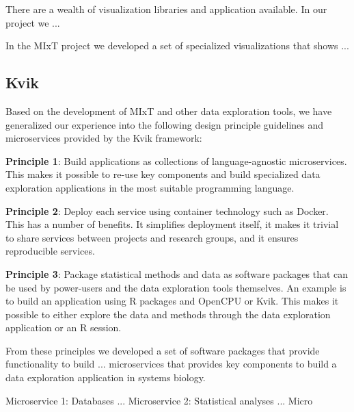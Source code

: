 There are a wealth of visualization libraries and application available. In our
project we ... 

In the MIxT project we developed a set of specialized visualizations that
shows ... 


\subsection*{Kvik}

Based on the development of MIxT and other data exploration tools, we have
generalized our experience into the following design principle guidelines and
microservices provided by the Kvik framework:

\textbf{Principle 1}: Build applications as collections of language-agnostic
microservices. This makes it possible to re-use key components and build
specialized data exploration applications in the most suitable programming
language. 

\textbf{Principle 2}: Deploy each service using container technology such as
Docker. This has a number of benefits. It simplifies deployment itself, it makes
it trivial to share services between projects and research groups, and it
ensures reproducible services.

\textbf{Principle 3}: Package statistical methods and data as software packages
that can be used by power-users and the data exploration tools themselves. An
example is to build an application using R packages and OpenCPU or Kvik. This
makes it possible to either explore the data and methods through the data
exploration application or an R session. 

From these principles we developed a set of software packages that provide
functionality to build ... microservices that provides key components to build a
data exploration application in systems biology. 

Microservice 1: Databases ...
Microservice 2: Statistical analyses ...
Micro


